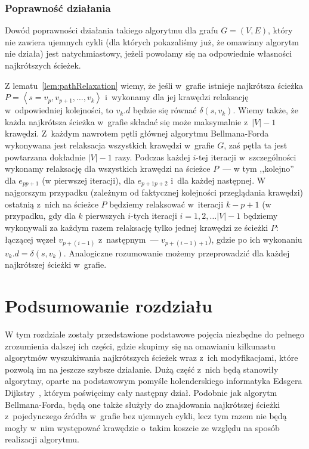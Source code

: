 \subsubsection{Poprawność działania}


Dowód poprawności działania takiego algorytmu dla grafu $G = \left( V, E \right)$, który nie zawiera ujemnych cykli (dla których pokazaliśmy już, że omawiany algorytm nie działa) jest natychmiastowy, jeżeli powołamy się na odpowiednie własności najkrótszych ścieżek.

Z lematu~\ref{lem:pathRelaxation} wiemy, że jeśli w~grafie istnieje najkrótsza ścieżka $P = \left \langle s=v_{p}, v_{p+1}, \dots, v_{k} \right \rangle $ i~wykonamy dla jej krawędzi relaksację w~odpowiedniej kolejności, to $v_{k}.d$ będzie się równać $\delta \left( s, v_{k} \right)$.
Wiemy także, że każda najkrótsza ścieżka w~grafie składać się może maksymalnie z~$ \left| V \right| - 1$ krawędzi.
Z~każdym nawrotem pętli głównej algorytmu Bellmana-Forda wykonywana jest relaksacja wszystkich krawędzi w~grafie $G$, zaś pętla ta jest powtarzana dokładnie $\left| V \right| - 1$ razy.
Podczas każdej $i$-tej iteracji w~szczególności wykonamy relaksację dla wszystkich krawędzi na ścieżce $P$~--- w tym ,,kolejno'' dla $e_{pp+1}$ (w pierwszej iteracji), dla $e_{p+1p+2}$ i~dla każdej następnej.
W najgorszym przypadku (zależnym od faktycznej kolejności przeglądania krawędzi) ostatnią z~nich na ścieżce $P$ będziemy relaksować w~iteracji $k-p+1$ (w przypadku, gdy dla $k$ pierwszych $i$-tych iteracji $i = 1, 2, \dots \left| V \right| - 1$ będziemy wykonywali za każdym razem relaksację tylko jednej krawędzi ze ścieżki $P$: łączącej węzeł $v_{p+ \left( i-1 \right)}$ z~następnym~--- $v_{p+ \left( i-1 \right) + 1}$), gdzie po ich wykonaniu $v_{k}.d = \delta \left( s, v_{k} \right)$.
Analogiczne rozumowanie możemy przeprowadzić dla każdej najkrótszej ścieżki w~grafie.




\section{Podsumowanie rozdziału}




W tym rozdziale zostały przedstawione podstawowe pojęcia niezbędne do pełnego zrozumienia dalszej ich części, gdzie skupimy się na omawianiu kilkunastu algorytmów wyszukiwania najkrótszych ścieżek wraz z~ich modyfikacjami, które pozwolą im na jeszcze szybsze działanie.
Dużą część z~nich będą stanowiły algorytmy, oparte na podstawowym pomyśle holenderskiego informatyka Edsgera Dijkstry~\cite{Dijkstra}, którym poświęcimy cały następny dział.
Podobnie jak algorytm Bellmana-Forda, będą one także służyły do znajdowania najkrótszej ścieżki z~pojedynczego źródła w~grafie bez ujemnych cykli, lecz tym razem nie będą mogły w~nim występować krawędzie o~takim koszcie ze względu na sposób realizacji algorytmu.